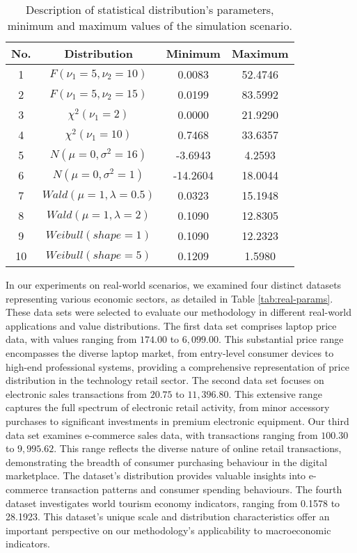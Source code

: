 \documentclass[lettersize,journal]{IEEEtran}
\begin{document}
\begin{table}[htbp]
    \centering
    \caption{Description of statistical distribution's parameters, minimum and maximum values of the simulation scenario.}
    \label{tab:dist-params}
    \begin{tabular}{cccc}
        \toprule
        \textbf{No.} & \textbf{Distribution} & \textbf{Minimum} & \textbf{Maximum} \\
        \midrule
        1 & $F(\nu_1 =5 ,\nu_2 =10)$ & 0.0083 & 52.4746 \\
        \midrule
         2 & $F(\nu_1 =5 ,\nu_2 =15)$ & 0.0199 & 83.5992 \\
         \midrule
         3 & $\chi^2(\nu_1 =2)$ & 0.0000 & 21.9290 \\
        \midrule
         4 & $\chi^2(\nu_1 =10)$ & 0.7468 & 33.6357 \\
         \midrule
         5 & $N(\mu =0 ,\sigma^2 =16)$ & -3.6943 & 4.2593 \\
         \midrule
         6 & $N(\mu =0 ,\sigma^2 =1)$ & -14.2604 & 18.0044 \\
         \midrule
         7 & $Wald(\mu =1 ,\lambda =0.5)$ & 0.0323 & 15.1948 \\
         \midrule
         8 & $Wald(\mu =1 ,\lambda =2)$ & 0.1090 & 12.8305 \\
         \midrule
         9 & $Weibull(shape =1)$ & 0.1090 & 12.2323 \\
         \midrule
         10 & $Weibull(shape =5)$ & 0.1209 & 1.5980 \\
        \bottomrule
    \end{tabular}
\end{table}

In our experiments on real-world scenarios, we examined four distinct datasets representing various economic sectors, as detailed in Table \ref{tab:real-params}. These data sets were selected to evaluate our methodology in different real-world applications and value distributions. The first data set comprises laptop price data, with values ranging from $174.00$ to $6,099.00$. This substantial price range encompasses the diverse laptop market, from entry-level consumer devices to high-end professional systems, providing a comprehensive representation of price distribution in the technology retail sector.
The second data set focuses on electronic sales transactions from $20.75$ to $11,396.80$. This extensive range captures the full spectrum of electronic retail activity, from minor accessory purchases to significant investments in premium electronic equipment. Our third data set examines e-commerce sales data, with transactions ranging from $100.30$ to $9,995.62$. This range reflects the diverse nature of online retail transactions, demonstrating the breadth of consumer purchasing behaviour in the digital marketplace. The dataset's distribution provides valuable insights into e-commerce transaction patterns and consumer spending behaviours. The fourth dataset investigates world tourism economy indicators, ranging from 0.1578 to 28.1923. This dataset's unique scale and distribution characteristics offer an important perspective on our methodology's applicability to macroeconomic indicators.
\end{document}
